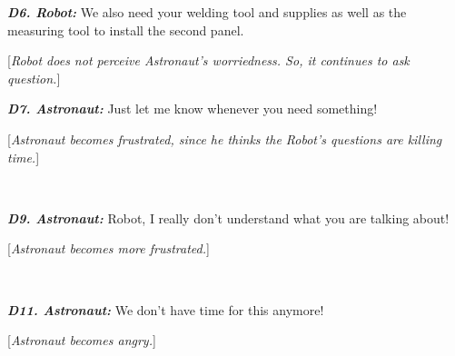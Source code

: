 \begin{spacing}{1.2}
{\begin{description}
  \item \textit{\textbf{D6. Robot:}} We also need your welding tool and supplies
  as well as the measuring tool to install the second panel.
  
  [\textit{Robot does not perceive Astronaut's worriedness. So, it continues to
  ask question.}]\\
  
  \item \textit{\textbf{D7. Astronaut:}} Just let me know whenever you need
  something!
  
  [\textit{Astronaut becomes frustrated, since he thinks the Robot's questions
  are killing time.}]\\
  
  \item {}\\
  
  \item \textit{\textbf{D9. Astronaut:}} Robot, I really don't understand what
  you are talking about!
  
  [\textit{Astronaut becomes more frustrated.}]\\
  
  \item {}\\

  \item \textit{\textbf{D11. Astronaut:}} We don't have time for this anymore!
  
  [\textit{Astronaut becomes angry.}]\\

\end{description}
}
\end{spacing}

